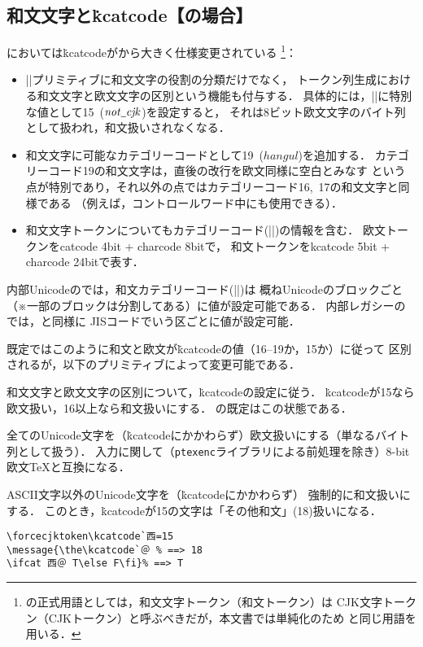 \documentclass[a4paper,11pt,nomag,dvipdfmx]{jsarticle}
\def\code#1{\texttt{#1}}
\def\_{\leavevmode\vrule width .45em height -.2ex depth .3ex\relax}
\begin{document}
\subsection{和文文字と\.{kcatcode}【\upTeX の場合】}
\label{sec:uptex_kcat}
\upTeX においては\.{kcatcode}が\pTeX から大きく仕様変更されている
\footnote{\upTeX の正式用語としては，和文文字トークン（和文トークン）は
CJK文字トークン（CJKトークン）と呼ぶべきだが，本文書では単純化のため
\pTeX と同じ用語を用いる．}：
\begin{itemize}
  \item |\kcatcode|プリミティブに和文文字の役割の分類だけでなく，
    トークン列生成における和文文字と欧文文字の区別という機能も付与する．
    具体的には，|\kcatcode|に特別な値として15~($\mathit{not\_cjk}$)を設定すると，
    それは8ビット欧文文字のバイト列として扱われ，和文扱いされなくなる．
  \item 和文文字に可能なカテゴリーコードとして19~($\mathit{hangul}$)を追加する．
    カテゴリーコード19の和文文字は，直後の改行を欧文同様に空白とみなす
    という点が特別であり，それ以外の点ではカテゴリーコード16,~17の和文文字と同様である
    （例えば，コントロールワード中にも使用できる）．
  \item 和文文字トークンについてもカテゴリーコード(|\kcatcode|)の情報を含む．
    欧文トークンをcatcode 4bit + charcode 8bitで，
    和文トークンをkcatcode 5bit + charcode 24bitで表す．
\end{itemize}

\begin{cslist}
  \csitem[\.{kcatcode} <character code>=<15--19>]
  内部Unicodeの\upTeX では，和文カテゴリーコード(|\kcatcode|)は
  概ねUnicodeのブロックごと（※一部のブロックは分割してある）に値が設定可能である．
  内部レガシーの\upTeX では，\pTeX と同様に
  JISコードでいう区ごとに値が設定可能．
\end{cslist}

既定ではこのように和文と欧文が\.{kcatcode}の値（16--19か，15か）に従って
区別されるが，以下のプリミティブによって変更可能である．

\begin{cslist}
 \csitem[\.{enablecjktoken}]
  和文文字と欧文文字の区別について，\.{kcatcode}の設定に従う．
  \.{kcatcode}が15なら欧文扱い，16以上なら和文扱いにする．
  \upTeX の既定はこの状態である．

 \csitem[\.{disablecjktoken}]
  全てのUnicode文字を（\.{kcatcode}にかかわらず）欧文扱いにする（単なるバイト列として扱う）．
  入力に関して（\code{ptexenc}ライブラリによる前処理を除き）8-bit欧文\TeX と互換になる．

 \csitem[\.{forcecjktoken}]
  ASCII文字以外のUnicode文字を（\.{kcatcode}にかかわらず）
  強制的に和文扱いにする．
  このとき，\.{kcatcode}が15の文字は「その他和文」(18)扱いになる．
\begin{verbatim}
\forcecjktoken\kcatcode`西=15
\message{\the\kcatcode`＠ % ==> 18
\ifcat 西＠ T\else F\fi}% ==> T
\end{verbatim}
\end{cslist}
\end{document}
